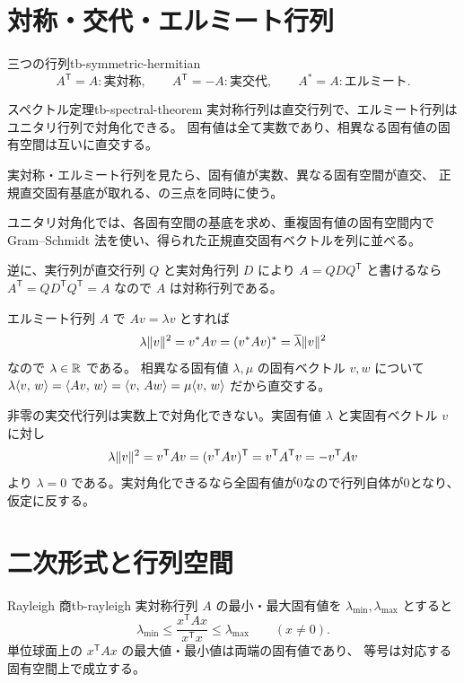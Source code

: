\section{対称・交代・エルミート行列}

\begin{definition}{三つの行列}{tb-symmetric-hermitian}
\[
A^{\mathsf T}=A:\text{実対称},\qquad
A^{\mathsf T}=-A:\text{実交代},\qquad
A^*=A:\text{エルミート}.
\]
\end{definition}

\begin{theorem}{スペクトル定理}{tb-spectral-theorem}
実対称行列は直交行列で、エルミート行列はユニタリ行列で対角化できる。
固有値は全て実数であり、相異なる固有値の固有空間は互いに直交する。
\end{theorem}

実対称・エルミート行列を見たら、固有値が実数、異なる固有空間が直交、
正規直交固有基底が取れる、の三点を同時に使う。

ユニタリ対角化では、各固有空間の基底を求め、重複固有値の固有空間内で
Gram--Schmidt 法を使い、得られた正規直交固有ベクトルを列に並べる。

逆に、実行列が直交行列 $Q$ と実対角行列 $D$ により
$A=QDQ^{\mathsf T}$ と書けるなら
$A^{\mathsf T}=QD^{\mathsf T}Q^{\mathsf T}=A$ なので $A$ は対称行列である。

エルミート行列 $A$ で $Av=\lambda v$ とすれば
\[
\lambda\lVert v \rVert^2=v^*Av=(v^*Av)^*=\overline\lambda\lVert v \rVert^2
\]
なので $\lambda\in\mathbb{R}$ である。
相異なる固有値 $\lambda,\mu$ の固有ベクトル $v,w$ について
$\lambda\langle v,\, w \rangle=\langle Av,\, w \rangle=\langle v,\, Aw \rangle=\mu\langle v,\, w \rangle$ だから直交する。

非零の実交代行列は実数上で対角化できない。実固有値 $\lambda$ と実固有ベクトル $v$ に対し
\[
\lambda\lVert v \rVert^2=v^{\mathsf T}Av
=(v^{\mathsf T}Av)^{\mathsf T}=v^{\mathsf T}A^{\mathsf T}v=-v^{\mathsf T}Av
\]
より $\lambda=0$ である。実対角化できるなら全固有値が0なので行列自体が0となり、仮定に反する。

\section{二次形式と行列空間}

\begin{theorem}{Rayleigh 商}{tb-rayleigh}
実対称行列 $A$ の最小・最大固有値を $\lambda_{\min},\lambda_{\max}$ とすると
\[
\lambda_{\min}\le\frac{x^{\mathsf T}Ax}{x^{\mathsf T}x}\le\lambda_{\max}\qquad(x\ne0).
\]
単位球面上の $x^{\mathsf T}Ax$ の最大値・最小値は両端の固有値であり、
等号は対応する固有空間上で成立する。
\end{theorem}


